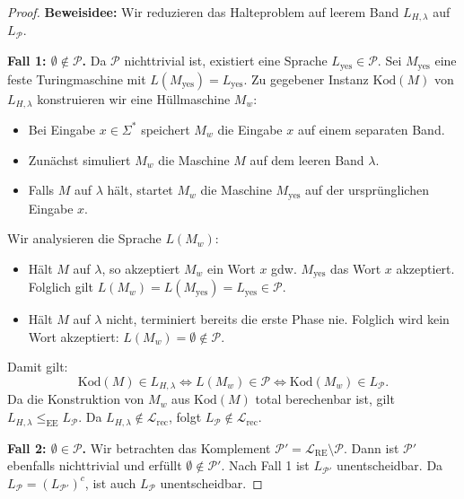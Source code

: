 \begin{proof}
    \textbf{Beweisidee:} Wir reduzieren das Halteproblem auf leerem Band $L_{H,\lambda}$ auf $L_{\mathcal{P}}$.
    
    \textbf{Fall 1: $\emptyset \notin \mathcal{P}$.}
    Da $\mathcal{P}$ nichttrivial ist, existiert eine Sprache $L_{\mathrm{yes}} \in \mathcal{P}$. Sei $M_{\mathrm{yes}}$ eine feste Turingmaschine mit $L(M_{\mathrm{yes}}) = L_{\mathrm{yes}}$.
    Zu gegebener Instanz $\mathrm{Kod}(M)$ von $L_{H,\lambda}$ konstruieren wir eine Hüllmaschine $M_w$:
    \begin{itemize}
        \item Bei Eingabe $x \in \Sigma^*$ speichert $M_w$ die Eingabe $x$ auf einem separaten Band.
        \item Zunächst simuliert $M_w$ die Maschine $M$ auf dem leeren Band $\lambda$.
        \item Falls $M$ auf $\lambda$ hält, startet $M_w$ die Maschine $M_{\mathrm{yes}}$ auf der ursprünglichen Eingabe $x$.
    \end{itemize}
    Wir analysieren die Sprache $L(M_w)$:
    \begin{itemize}
        \item Hält $M$ auf $\lambda$, so akzeptiert $M_w$ ein Wort $x$ gdw. $M_{\mathrm{yes}}$ das Wort $x$ akzeptiert. Folglich gilt $L(M_w) = L(M_{\mathrm{yes}}) = L_{\mathrm{yes}} \in \mathcal{P}$.
        \item Hält $M$ auf $\lambda$ nicht, terminiert bereits die erste Phase nie. Folglich wird kein Wort akzeptiert: $L(M_w) = \emptyset \notin \mathcal{P}$.
    \end{itemize}
    Damit gilt:
    \[
        \mathrm{Kod}(M) \in L_{H,\lambda} \iff L(M_w) \in \mathcal{P} \iff \mathrm{Kod}(M_w) \in L_{\mathcal{P}}.
    \]
    Da die Konstruktion von $M_w$ aus $\mathrm{Kod}(M)$ total berechenbar ist, gilt $L_{H,\lambda} \le_{\mathrm{EE}} L_{\mathcal{P}}$. Da $L_{H,\lambda} \notin \mathcal{L}_{\mathrm{rec}}$, folgt $L_{\mathcal{P}} \notin \mathcal{L}_{\mathrm{rec}}$.
    
    \textbf{Fall 2: $\emptyset \in \mathcal{P}$.}
    Wir betrachten das Komplement $\mathcal{P}' = \mathcal{L}_{\mathrm{RE}} \setminus \mathcal{P}$. Dann ist $\mathcal{P}'$ ebenfalls nichttrivial und erfüllt $\emptyset \notin \mathcal{P}'$. Nach Fall 1 ist $L_{\mathcal{P}'}$ unentscheidbar. Da $L_{\mathcal{P}} = (L_{\mathcal{P}'})^c$, ist auch $L_{\mathcal{P}}$ unentscheidbar.
\end{proof}

